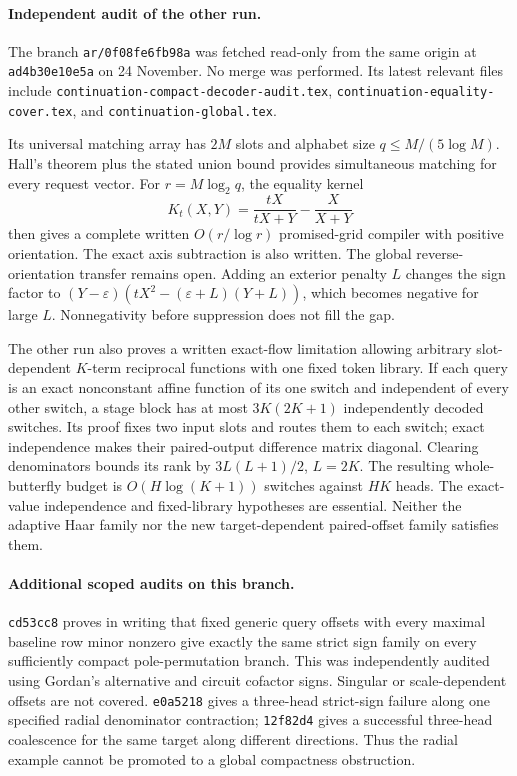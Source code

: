 \documentclass[11pt]{article}
\begin{document}
\paragraph{Independent audit of the other run.}
The branch \texttt{ar/0f08fe6fb98a} was fetched read-only from the
same origin at \texttt{ad4b30e10e5a} on 24 November. No merge was
performed. Its latest relevant files include
\texttt{continuation-compact-decoder-audit.tex},
\texttt{continuation-equality-cover.tex}, and
\texttt{continuation-global.tex}.

Its universal matching array has $2M$ slots and alphabet size
$q\leq M/(5\log M)$. Hall's theorem plus the stated union bound
provides simultaneous matching for every request vector. For
$r=M\log_2q$, the equality kernel
\[
 K_t(X,Y)=\frac{tX}{tX+Y}-\frac X{X+Y}
\]
then gives a complete written $O(r/\log r)$ promised-grid compiler
with positive orientation. The exact axis subtraction is also written.
The global reverse-orientation transfer remains open. Adding an exterior
penalty $L$ changes the sign factor to
$(Y-\varepsilon)(tX^2-(\varepsilon+L)(Y+L))$, which becomes negative
for large $L$. Nonnegativity before suppression does not fill the gap.

The other run also proves a written exact-flow limitation allowing
arbitrary slot-dependent $K$-term reciprocal functions with one fixed
token library. If each query is an exact nonconstant affine function
of its one switch and independent of every other switch, a stage
block has at most $3K(2K+1)$ independently decoded switches. Its
proof fixes two input slots and routes them to each switch; exact
independence makes their paired-output difference matrix diagonal.
Clearing denominators bounds its rank by $3L(L+1)/2$, $L=2K$.
The resulting whole-butterfly budget is $O(H\log(K+1))$ switches
against $HK$ heads. The exact-value independence and fixed-library
hypotheses are essential. Neither the adaptive Haar family nor the
new target-dependent paired-offset family satisfies them.

\paragraph{Additional scoped audits on this branch.}
\texttt{cd53cc8} proves in writing that fixed generic query offsets
with every maximal baseline row minor nonzero give exactly the same
strict sign family on every sufficiently compact pole-permutation
branch. This was independently audited using Gordan's alternative
and circuit cofactor signs. Singular or scale-dependent offsets are
not covered. \texttt{e0a5218} gives a three-head strict-sign failure
along one specified radial denominator contraction;
\texttt{12f82d4} gives a successful three-head coalescence for the
same target along different directions. Thus the radial example
cannot be promoted to a global compactness obstruction.
\end{document}
